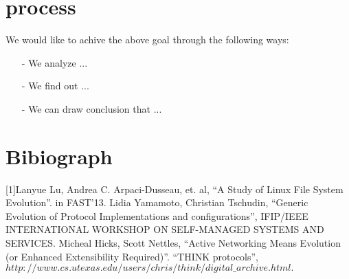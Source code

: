 \documentclass[10pt, a4paper, onecolumn, fleqn]{article}
\begin{document}
\section{process}
We would like to achive the above goal through the following ways:
\begin{enumerate}
\item[-]We analyze ...
\item[-]We find out ...
\item[-]We can draw conclusion that ...
\end{enumerate}



\section{Bibiograph}
[1]Lanyue Lu, Andrea C. Arpaci-Dusseau, et. al, ``A Study of Linux File System Evolution''. in FAST'13.
\newline
[2]Lidia Yamamoto, Christian Tschudin, ``Generic Evolution of Protocol Implementations and configurations'', IFIP/IEEE INTERNATIONAL WORKSHOP ON SELF-MANAGED SYSTEMS AND SERVICES.
\newline
[3]Micheal Hicks, Scott Nettles, ``Active Networking Means Evolution (or Enhanced Extensibility Required)''.
\newline
[4]``THINK protocols'', $http://www.cs.utexas.edu/users/chris/think/digital\_archive.html.$
\end{document}
